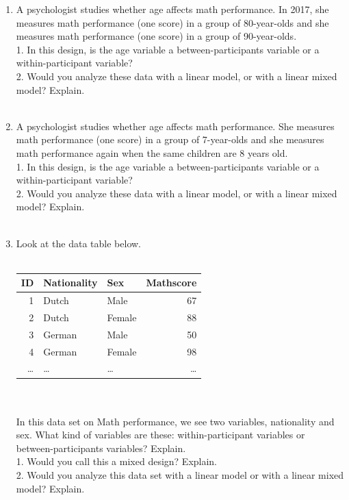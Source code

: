 \documentclass[]{report}\usepackage[]{graphicx}\usepackage[]{color}
\begin{document}
\begin{enumerate}
\item A psychologist studies whether age affects math performance. In 2017, she measures math performance (one score) in a group of 80-year-olds and she measures math performance (one score) in a group of 90-year-olds. \\
1. In this design, is the age variable a between-participants variable or a within-participant variable?  \\
2. Would you analyze these data with a linear model, or with a linear mixed model? Explain. 
\\
\\
\item A psychologist studies whether age affects math performance. She measures math performance (one score) in a group of 7-year-olds and she measures math performance again when the same children are 8 years old. \\
1. In this design, is the age variable a between-participants variable or a within-participant variable?  \\
2. Would you analyze these data with a linear model, or with a linear mixed model? Explain. 
\\
\\
\item Look at the data table below.
\\
 \\
 \begin{tabular}{rllr}
  ID & Nationality & Sex & Mathscore  \\ \hline
  1   & Dutch      &  Male & 67   \\
 2   &  Dutch     &  Female & 88   \\
 3    & German         &  Male & 50   \\
 4   &  German        &  Female & 98  \\
  \dots   & \dots        &  \dots& \dots  \\
 \end{tabular}
\\
\\
In this data set on Math performance, we see two variables, nationality and sex. What kind of variables are these: within-participant variables or between-participants variables? Explain.
\\
1. Would you call this a mixed design? Explain.\\
2. Would you analyze this data set with a linear model or with a linear mixed model? Explain.
\\

\end{enumerate}
\end{document}
